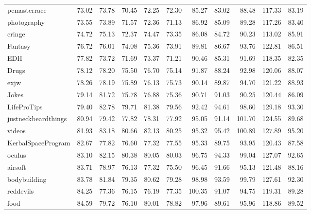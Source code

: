 \begin{tabular}{lrrrrrrrrrr}
pcmasterrace        &  73.02 &  73.78 &  70.45 & 72.25 &  72.30 &       85.27 &  83.02 &  88.48 & 117.33 &  83.19 \\
photography         &  73.55 &  73.89 &  71.57 & 72.36 &  71.13 &       86.92 &  85.09 &  89.28 & 117.26 &  83.40 \\
cringe              &  74.72 &  75.13 &  72.37 & 74.47 &  73.35 &       86.08 &  84.72 &  90.23 & 113.02 &  85.91 \\
Fantasy             &  76.72 &  76.01 &  74.08 & 75.36 &  73.91 &       89.81 &  86.67 &  93.76 & 122.81 &  86.51 \\
EDH                 &  77.82 &  73.72 &  71.69 & 73.37 &  71.21 &       90.46 &  85.31 &  91.69 & 118.35 &  82.35 \\
Drugs               &  78.12 &  78.20 &  75.50 & 76.70 &  75.14 &       91.87 &  88.24 &  92.98 & 120.06 &  88.07 \\
exjw                &  78.26 &  78.19 &  75.89 & 76.13 &  75.73 &       90.14 &  89.87 &  94.70 & 121.22 &  88.93 \\
Jokes               &  79.14 &  81.72 &  75.78 & 76.88 &  75.36 &       90.71 &  91.03 &  90.25 & 120.44 &  86.09 \\
LifeProTips         &  79.40 &  82.78 &  79.71 & 81.38 &  79.56 &       92.42 &  94.61 &  98.60 & 129.18 &  93.30 \\
justneckbeardthings &  80.94 &  79.42 &  77.82 & 78.31 &  77.92 &       95.05 &  91.14 & 101.70 & 124.55 &  89.68 \\
videos              &  81.93 &  83.18 &  80.66 & 82.13 &  80.25 &       95.32 &  95.42 & 100.89 & 127.89 &  95.20 \\
KerbalSpaceProgram  &  82.67 &  77.82 &  76.60 & 77.32 &  77.55 &       95.33 &  89.75 &  93.95 & 120.43 &  87.58 \\
oculus              &  83.10 &  82.15 &  80.38 & 80.05 &  80.03 &       96.75 &  94.33 &  99.04 & 127.07 &  92.65 \\
airsoft             &  83.71 &  78.97 &  76.13 & 77.32 &  75.50 &       96.45 &  91.66 &  95.13 & 121.48 &  88.16 \\
bodybuilding        &  83.78 &  81.84 &  79.35 & 80.62 &  79.28 &       98.98 &  93.59 &  99.79 & 127.61 &  92.30 \\
reddevils           &  84.25 &  77.36 &  76.15 & 76.19 &  77.35 &      100.35 &  91.07 &  94.75 & 119.31 &  89.28 \\
food                &  84.59 &  79.72 &  76.10 & 80.01 &  78.82 &       97.96 &  89.61 &  95.96 & 118.86 &  89.52 \\

\end{tabular}
